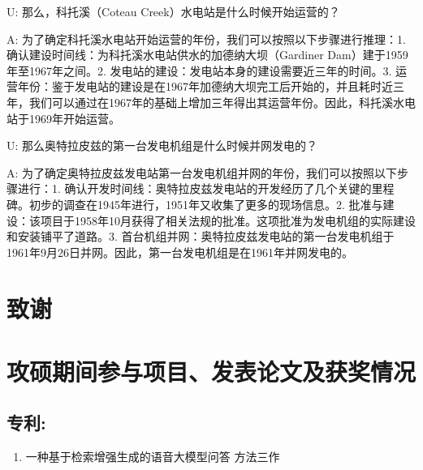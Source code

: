 U: 那么，科托溪（Coteau Creek）水电站是什么时候开始运营的？

A: 为了确定科托溪水电站开始运营的年份，我们可以按照以下步骤进行推理：1. 确认建设时间线：为科托溪水电站供水的加德纳大坝（Gardiner Dam）建于1959年至1967年之间。2. 发电站的建设：发电站本身的建设需要近三年的时间。3. 运营年份：鉴于发电站的建设是在1967年加德纳大坝完工后开始的，并且耗时近三年，我们可以通过在1967年的基础上增加三年得出其运营年份。因此，科托溪水电站于1969年开始运营。

U: 那么奥特拉皮兹的第一台发电机组是什么时候并网发电的？

A: 为了确定奥特拉皮兹发电站第一台发电机组并网的年份，我们可以按照以下步骤进行：1. 确认开发时间线：奥特拉皮兹发电站的开发经历了几个关键的里程碑。初步的调查在1945年进行，1951年又收集了更多的现场信息。2. 批准与建设：该项目于1958年10月获得了相关法规的批准。这项批准为发电机组的实际建设和安装铺平了道路。3. 首台机组并网：奥特拉皮兹发电站的第一台发电机组于1961年9月26日并网。因此，第一台发电机组是在1961年并网发电的。




\cleardoublepage[plain]



\chapter[致谢]{致\quad 谢}%



\reviewORprint{
}{
   
}

\chapter{攻硕期间参与项目、发表论文及获奖情况}


\section*{专利:}
\begin{enumerate}[leftmargin=*]
    \item 一种基于检索增强生成的语音大模型问答
方法\quad 三作
\end{enumerate}

